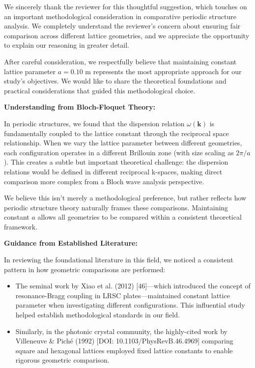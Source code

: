 \documentclass[11pt,a4paper]{article}
\newenvironment{responsebox}{%
    \par\medskip\noindent{\color{responsecolor}\rule{\linewidth}{2pt}}\par
    \noindent{\color{responsecolor}\bfseries Response}\par\smallskip
}{%
    \par\noindent{\color{responsecolor}\rule{\linewidth}{0.5pt}}\medskip
}
\begin{document}
\begin{responsebox}
We sincerely thank the reviewer for this thoughtful suggestion, which touches on an important methodological consideration in comparative periodic structure analysis. We completely understand the reviewer's concern about ensuring fair comparison across different lattice geometries, and we appreciate the opportunity to explain our reasoning in greater detail.

After careful consideration, we respectfully believe that maintaining constant lattice parameter $a = 0.10$ m represents the most appropriate approach for our study's objectives. We would like to share the theoretical foundations and practical considerations that guided this methodological choice.

\textbf{Understanding from Bloch-Floquet Theory:}

In periodic structures, we found that the dispersion relation $\omega(\mathbf{k})$ is fundamentally coupled to the lattice constant through the reciprocal space relationship. When we vary the lattice parameter between different geometries, each configuration operates in a different Brillouin zone (with size scaling as $2\pi/a$). This creates a subtle but important theoretical challenge: the dispersion relations would be defined in different reciprocal k-spaces, making direct comparison more complex from a Bloch wave analysis perspective.

We believe this isn't merely a methodological preference, but rather reflects how periodic structure theory naturally frames these comparisons. Maintaining constant $a$ allows all geometries to be compared within a consistent theoretical framework.

\textbf{Guidance from Established Literature:}

In reviewing the foundational literature in this field, we noticed a consistent pattern in how geometric comparisons are performed:

\begin{itemize}
    \item The seminal work by Xiao et al. (2012) [46]---which introduced the concept of resonance-Bragg coupling in LRSC plates---maintained constant lattice parameter when investigating different configurations. This influential study helped establish methodological standards in our field.

    \item Similarly, in the photonic crystal community, the highly-cited work by Villeneuve \& Pich\'{e} (1992) [DOI: 10.1103/PhysRevB.46.4969] comparing square and hexagonal lattices employed fixed lattice constants to enable rigorous geometric comparison.
\end{itemize}


\end{responsebox}
\end{document}
